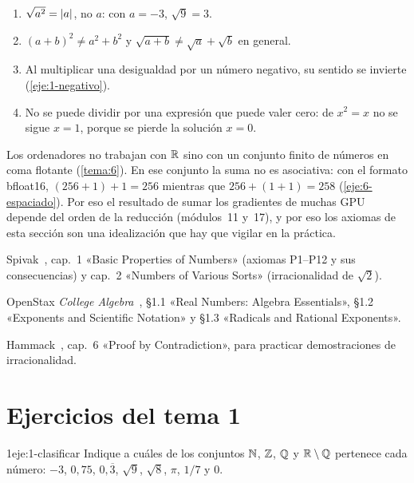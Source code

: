 \begin{observacion}
\begin{enumerate}[label=(\alph*)]
\item $\sqrt{a^2}=\lvert a\rvert$, no $a$: con $a=-3$, $\sqrt{9}=3$.
\item $(a+b)^2\neq a^2+b^2$ y $\sqrt{a+b}\neq\sqrt a+\sqrt b$ en general.
\item Al multiplicar una desigualdad por un número negativo, su sentido se invierte (\cref{eje:1-negativo}).
\item No se puede dividir por una expresión que puede valer cero: de $x^2=x$ no se sigue $x=1$, porque se pierde la solución $x=0$.
\end{enumerate}
\end{observacion}

\begin{observacion}
Los ordenadores no trabajan con $\mathbb{R}$ sino con un conjunto finito de números en coma flotante (\cref{tema:6}). En ese conjunto la suma no es asociativa: con el formato bfloat16, $(256+1)+1=256$ mientras que $256+(1+1)=258$ (\cref{eje:6-espaciado}). Por eso el resultado de sumar los gradientes de muchas GPU depende del orden de la reducción (módulos~11 y~17), y por eso los axiomas de esta sección son una idealización que hay que vigilar en la práctica.
\end{observacion}

\begin{lecturas}
\item Spivak~\cite{spivak}, cap.~1 «Basic Properties of Numbers» (axiomas P1--P12 y sus consecuencias) y cap.~2 «Numbers of Various Sorts» (irracionalidad de $\sqrt2$).
\item OpenStax \emph{College Algebra}~\cite{openstax}, §1.1 «Real Numbers: Algebra Essentials», §1.2 «Exponents and Scientific Notation» y §1.3 «Radicals and Rational Exponents».
\item Hammack~\cite{hammack}, cap.~6 «Proof by Contradiction», para practicar demostraciones de irracionalidad.
\end{lecturas}

\section*{Ejercicios del tema 1}

\begin{ejercicio}{1}{eje:1-clasificar}
Indique a cuáles de los conjuntos $\mathbb{N}$, $\mathbb{Z}$, $\mathbb{Q}$ y $\mathbb{R}\setminus\mathbb{Q}$ pertenece cada número: $-3$, $0{,}75$, $0{,}\overline{3}$, $\sqrt9$, $\sqrt8$, $\pi$, $1/7$ y $0$.
\end{ejercicio}

